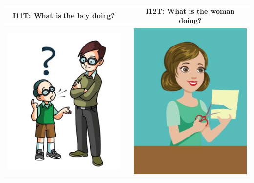 \documentclass[12pt,notitlepage]{article}
\begin{document}
\begin{center}
\begin{tabular}{|c|c|c|}
\hline
I11T: What is the boy doing? && I12T: What is the woman doing? \\
\hline
\includegraphics[width=20em,trim=0 0 0 -3]{figures/I11.jpg} & & \includegraphics[width=20em,trim=0 0 0 -3]{figures/I12.jpg} \\
\hline
\end{tabular}
\vspace{1em} \\



\end{center}
\end{document}
